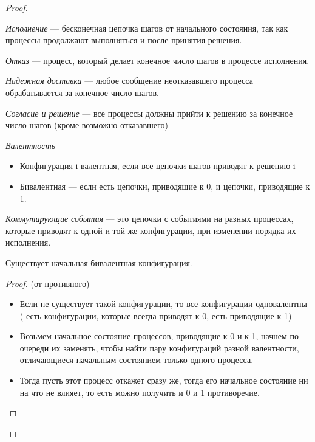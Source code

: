 \begin{proof}
\begin{definition}
        \textit{Исполнение} --- бесконечная цепочка шагов от начального состояния, так как процессы продолжают выполняться и после принятия решения.
    \end{definition}
    \begin{definition}
        \textit{Отказ} --- процесс, который делает конечное число шагов в процессе исполнения.
    \end{definition}
    \begin{definition}
        \textit{Надежная доставка} --- любое сообщение неотказавшего процесса обрабатывается за конечное число шагов.
    \end{definition}
    \begin{definition}
        \textit{Согласие и решение} --- все процессы должны прийти к решению за конечное число шагов (кроме возможно отказавшего)
    \end{definition}
    \begin{definition}
        \textit{Валентность}
        \begin{itemize}
            \item Конфигурация i-валентная, если все цепочки шагов приводят к решению i
            \item Бивалентная --- если есть цепочки, приводящие к 0, и цепочки, приводящие к 1.
        \end{itemize}
    \end{definition}
    \begin{definition}
        \textit{Коммутирующие события} --- это цепочки с событиями на разных процессах, которые приводят к одной и той же конфигурации, при изменении порядка их исполнения.
    \end{definition}
    \begin{lemma} Существует начальная бивалентная конфигурация.
    \end{lemma}
    \begin{proof} (от противного)
        \begin{itemize}
            \item Если не существует такой конфигурации, то все конфигурации одновалентны ( есть конфигурации, которые всегда приводят к 0, есть приводящие к 1)
            \item Возьмем начальное состояние процессов, приводящие к 0 и к 1, начнем по очереди их заменять, чтобы найти пару конфигураций разной валентности, отличающиеся начальным состоянием только одного процесса.
            \item Тогда пусть этот процесс откажет сразу же, тогда его начальное состояние ни на что не влияет, то есть можно получить и 0 и 1 противоречие.

\end{itemize}
\end{proof}
\end{proof}
